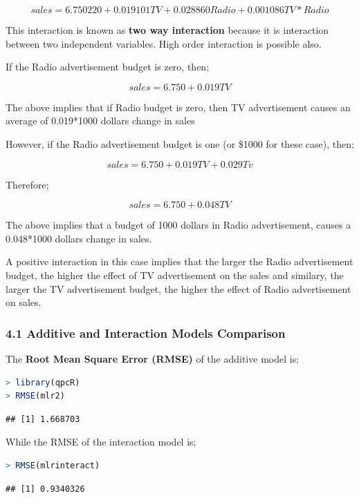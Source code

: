 \documentclass[
]{article}
\begin{document}
\[sales=6.750220 +0.019101TV+0.028860Radio+  0.001086TV*Radio\]

This interaction is known as \textbf{two way interaction} because it is
interaction between two independent variables. High order interaction is
possible also.

If the Radio advertisement budget is zero, then;

\[sales=6.750+0.019TV\]

The above implies that if Radio budget is zero, then TV advertisement
causes an average of 0.019*1000 dollars change in sales

However, if the Radio advertisement budget is one (or \$1000 for these
case), then;

\[sales=6.750+0.019TV+0.029Tv\]

Therefore;

\[sales=6.750+0.048TV\]

The above implies that a budget of 1000 dollars in Radio advertisement,
causes a 0.048*1000 dollars change in sales.

A positive interaction in this case implies that the larger the Radio
advertisement budget, the higher the effect of TV advertisement on the
sales and similary, the larger the TV advertisement budget, the higher
the effect of Radio advertisement on sales.

\hypertarget{additive-and-interaction-models-comparison}{%
\subsubsection{4.1 Additive and Interaction Models
Comparison}\label{additive-and-interaction-models-comparison}}

The \textbf{Root Mean Square Error (RMSE)} of the additive model is;

\begin{lstlisting}[language=R]
> library(qpcR)
> RMSE(mlr2)
\end{lstlisting}

\begin{lstlisting}
## [1] 1.668703
\end{lstlisting}

While the RMSE of the interaction model is;

\begin{lstlisting}[language=R]
> RMSE(mlrinteract)
\end{lstlisting}

\begin{lstlisting}
## [1] 0.9340326
\end{lstlisting}
\end{document}
